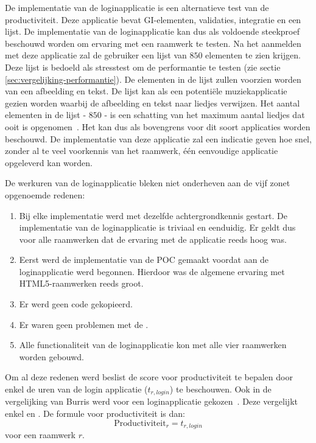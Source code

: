 De implementatie van de loginapplicatie is een alternatieve test van de productiviteit.
Deze applicatie bevat GI-elementen, validaties,   integratie en een lijst.
De implementatie van de loginapplicatie kan dus als voldoende steekproef beschouwd worden om ervaring met een raamwerk te testen.
Na het aanmelden met deze applicatie zal de gebruiker een lijst van $850$ elementen te zien krijgen.
Deze lijst is bedoeld als stresstest om de performantie te testen (zie sectie \ref{sec:vergelijking-performantie}).
De elementen in de lijst zullen voorzien worden van een afbeelding en tekst.
De lijst kan als een potentiële muziekapplicatie gezien worden waarbij de afbeelding en tekst naar liedjes verwijzen.
Het aantal elementen in de lijst - $850$ - is een schatting van het maximum aantal liedjes dat ooit is opgenomen~\cite{Zimmy2011}.
Het kan dus als bovengrens voor dit soort applicaties worden beschouwd.
De implementatie van deze applicatie zal een indicatie geven hoe snel,  zonder al te veel voorkennis van het raamwerk,  één eenvoudige applicatie opgeleverd kan worden.

De werkuren van de loginapplicatie bleken niet onderheven aan de vijf zonet opgenoemde redenen:
\begin{enumerate}
\item Bij elke implementatie werd met dezelfde achtergrondkennis gestart.  
De implementatie van de loginapplicatie is triviaal en eenduidig.
Er geldt dus voor alle raamwerken dat de ervaring met de applicatie reeds hoog was.
\item Eerst werd de implementatie van de POC gemaakt voordat aan de loginapplicatie werd begonnen.
Hierdoor was de algemene ervaring met HTML5-raamwerken reeds groot.
\item Er werd geen code gekopieerd. 
\item Er waren geen problemen met de .
\item Alle functionaliteit van de loginapplicatie kon met alle vier raamwerken worden gebouwd.
\end{enumerate}
Om al deze redenen werd beslist de score voor productiviteit te bepalen door enkel de uren van de login applicatie ($t_{r,login}$) te beschouwen.
Ook in de vergelijking van Burris werd voor een loginapplicatie gekozen~\cite{Burris}.
Deze vergelijkt enkel \st{} en \jqm{}.
De formule voor productiviteit is dan:
\begin{equation}
  \text{Productiviteit}_r = t_{r,login}
  \label{eq:productiviteit-enhanced}
\end{equation}
voor een raamwerk $r$.

